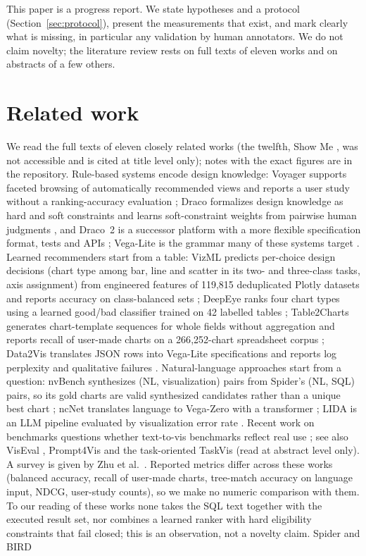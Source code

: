 \documentclass[11pt]{article}
\begin{document}
This paper is a progress report. We state hypotheses and a protocol (Section~\ref{sec:protocol}), present the measurements that exist, and mark clearly what is missing, in particular any validation by human annotators. We do not claim novelty; the literature review rests on full texts of eleven works and on abstracts of a few others.

\section{Related work}
We read the full texts of eleven closely related works (the twelfth, Show Me \cite{mackinlay2007showme}, was not accessible and is cited at title level only); notes with the exact figures are in the repository. Rule-based systems encode design knowledge: Voyager supports faceted browsing of automatically recommended views and reports a user study without a ranking-accuracy evaluation \cite{wongsuphasawat2016voyager}; Draco formalizes design knowledge as hard and soft constraints and learns soft-constraint weights from pairwise human judgments \cite{moritz2018draco}, and Draco~2 is a successor platform with a more flexible specification format, tests and APIs \cite{yang2023draco2}; Vega-Lite is the grammar many of these systems target \cite{satyanarayan2017vegalite}. Learned recommenders start from a table: VizML predicts per-choice design decisions (chart type among bar, line and scatter in its two- and three-class tasks, axis assignment) from engineered features of 119{,}815 deduplicated Plotly datasets and reports accuracy on class-balanced sets \cite{hu2019vizml}; DeepEye ranks four chart types using a learned good/bad classifier trained on 42 labelled tables \cite{luo2018deepeye}; Table2Charts generates chart-template sequences for whole fields without aggregation and reports recall of user-made charts on a 266{,}252-chart spreadsheet corpus \cite{zhou2020table2charts}; Data2Vis translates JSON rows into Vega-Lite specifications and reports log perplexity and qualitative failures \cite{dibia2019data2vis}. Natural-language approaches start from a question: nvBench synthesizes (NL, visualization) pairs from Spider's (NL, SQL) pairs, so its gold charts are valid synthesized candidates rather than a unique best chart \cite{luo2021nvbench}; ncNet translates language to Vega-Zero with a transformer \cite{luo2022ncnet}; LIDA is an LLM pipeline evaluated by visualization error rate \cite{dibia2023lida}. Recent work on benchmarks questions whether text-to-vis benchmarks reflect real use \cite{nguyen2024benchmarks}; see also VisEval \cite{chen2024viseval}, Prompt4Vis \cite{li2024prompt4vis} and the task-oriented TaskVis \cite{shen2022taskbased} (read at abstract level only). A survey is given by Zhu et al.\ \cite{zhu2020survey}. Reported metrics differ across these works (balanced accuracy, recall of user-made charts, tree-match accuracy on language input, NDCG, user-study counts), so we make no numeric comparison with them. To our reading of these works none takes the SQL text together with the executed result set, nor combines a learned ranker with hard eligibility constraints that fail closed; this is an observation, not a novelty claim. Spider \cite{yu2018spider} and BIRD 
\end{document}

